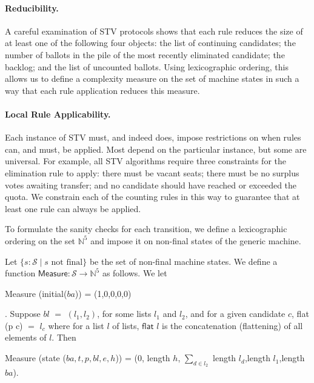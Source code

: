 \documentclass{llncs}
\begin{document}
\paragraph{Reducibility.} 
A careful examination of STV protocols shows that each rule
reduces the size of at least one of the following four
objects: the list of continuing candidates; the number of 
ballots in the pile of the most recently eliminated candidate;  the
backlog; and the list of uncounted ballots. Using lexicographic
ordering, this allows us to define 
a complexity measure on the set of
machine states in such a way that each rule application reduces this
measure. 

\paragraph{Local Rule Applicability.}
Each instance of STV must, and indeed does, impose 
restrictions on when rules can, and must, be applied. Most
depend on the particular instance, but some
are universal. For example, all STV
algorithms require three constraints for the elimination
rule to apply: there must be vacant seats; there must be
no surplus votes awaiting transfer; and no candidate should have
reached or exceeded the quota. We constrain each of the counting
rules in this way to guarantee that at least one rule can always be
applied. 

To formulate the sanity checks for each transition, we 
define a lexicographic ordering on the set 
$\mathbb{N}^5$
and impose it on non-final states of the generic machine.   

\begin{definition} \label{defn:measure}
Let $\{s: \mathcal{S} \mid s\mbox{ not final}\}$ be the set of
non-final machine states. We define a function $\mathsf{Measure}:
\mathcal{S} \to
\mathbb{N}^5$ as follows. We let
\begin{small}\textsf{Measure} (\textsf{initial}($ba$)) =
(1,0,0,0,0)\end{small}. Suppose $bl$ $=$ $(l_{1},l_{2})$, for some
lists $l_{1}$ and $l_{2}$, and for a given candidate $c$,
\textsf{flat} (p c) $=$ $l_{c}$ where for a list $l$ of lists,  $\mathsf{flat}$ $l$ is the
concatenation (flattening) of all elements of $l$. Then
\begin{small}
\begin{center}
 \textsf{Measure} (\textsf{state} ($ba,t,p,bl,e,h$)) = (0,
 \textsf{length} $h$, $\sum_{d\in l_{2}}^{}$ \textsf{length}
 $l_{d}$,\textsf{length} $l_{1}$,\textsf{length}  $ba$).
\end{center}
\end{small}
\end{definition}
\end{document}
